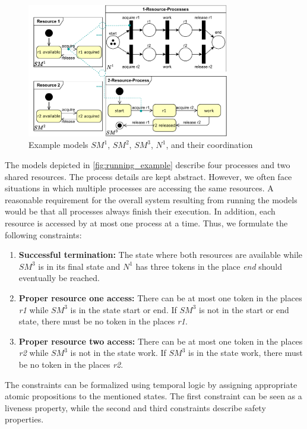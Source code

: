 \documentclass[conference]{IEEEtran}
\begin{document}
\begin{figure}[h]
    \centering
    \includegraphics[width=3.48in]{example}
    \caption{Example models $SM^1$, $SM^2$, $SM^3$, $N^1$, and their coordination}
    \label{fig:running_example}
\end{figure}

The models depicted in \autoref{fig:running_example} describe four processes and two shared resources.
The process details are kept abstract.
However, we often face situations in which multiple processes are accessing the same resources.
A reasonable requirement for the overall system resulting from running the models would be that all processes always finish their execution.
In addition, each resource is accessed by at most one process at a time.
Thus, we formulate the following constraints:
\begin{enumerate}
    \item \textbf{Successful termination:} The state where both resources are available while $SM^3$ is in its final state and $N^1$ has three tokens in the place \textit{end} should eventually be reached.
    \item \textbf{Proper resource one access:} There can be at most one token in the places \textit{r1} while $SM^3$ is in the state start or end.
    If $SM^3$ is not in the start or end state, there must be no token in the places \textit{r1}.
    \item \textbf{Proper resource two access:} There can be at most one token in the places \textit{r2} while $SM^3$ is not in the state work.
    If $SM^3$ is in the state work, there must be no token in the places \textit{r2}.
\end{enumerate}

The constraints can be formalized using temporal logic by assigning appropriate atomic propositions to the mentioned states.
The first constraint can be seen as a liveness property, while the second and third constraints describe safety properties.
\end{document}
